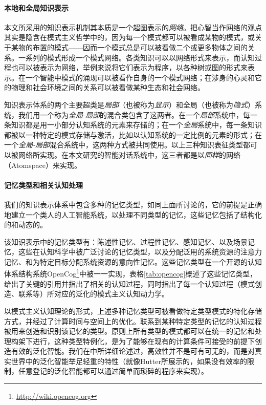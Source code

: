 \paragraph{本地和全局知识表示}

本文所采用的知识表示机制其本质是一个超图表示的{\it 网络}。把心智当作网络的观点其实是隐含在模式主义哲学中的，因为每一个模式都可以被看成某物的模式，或关于某物的布置的模式——因而一个模式总是可以被看做二个或更多物体之间的关系。一系列的模式形成一个模式网络。各类知识可以以网络形式来表示，而认知过程也可以被表示为网络，举例来说将它们表示为程序，以各种树或图的形式来表示。在一个智能中模式的涌现可以被看作自身的一个模式网络；在涉身的心灵和它的物理和社会环境之间的关系可以被看做某种生态和社会网络。

知识表示体系的两个主要超类是{\it 局部}（也被称为{\it 显示}）和全局（也被称为{\it 隐式}）系统，我们用一个称为{\it 全局-局部}的混合类包含了这两者。在一个{\it 局部}系统中，每一条知识都是用一小部分认知系统的元素来存储的；在一个{\it 全局}系统中，每一条知识都被以一种特定的模式存储与激活，比如以认知系统的一定比例的元素的形式；在一个{\it 全局-局部}混合系统中，这两种方式被共同使用。以上三种知识表征类型都可以被网络所实现。在本文研究的智能对话系统中，这三者都是以{\it 同样}的网络（Atomspace）来实现。

\paragraph{记忆类型和相关认知处理}

我们的知识表示体系中包含多种的记忆类型，如同上面所讨论的，它的前提是正确地建立一个类人的人工智能系统，以处理不同类型的记忆，这些记忆包括了结构化的和动态的。

该知识表示中的记忆类型有：陈述性记忆、过程性记忆、感知记忆、以及场景记忆，这些在认知科学中被广泛讨论\cite{Tulving2005}的记忆类型，以及分配泛用的系统资源的注意力记忆、和为特定目标分配系统资源的意向性记忆。这些记忆类型在一个开源的认知体系结构系统OpenCog\footnote {\url{http://wiki.opencog.org}}中被一一实现，表格\ref{tab:opencog}概述了这些记忆类型，给出了关键的引用并指出了相关的认知过程，同时指出了每一个认知过程（模式创造、联系等）所对应的泛化的模式主义认知动力学。

以模式主义认知理论的形式，上述多种记忆类型可被看做特定类型模式的特化存储方式，并经过了计算时间与空间上的优化。联系到某种特定类型的记忆的认知过程被用来创造和识别该记忆的类型。原则上所有类型的模式都可以在统一的记忆和处理构架下进行，这种类型特例化，是为了能够在现有的计算条件可接受的前提下创造有效的泛化智能。我们在\cite{Goertzel2010c}中所详细论述过，高效性并不是可有可无的，而是对真实世界中的泛化智能举足轻重的特性（就像Hutter所展示的，如果没有效率的限制，任意登记的泛化智能都可以通过简单而琐碎的程序来实现）。


